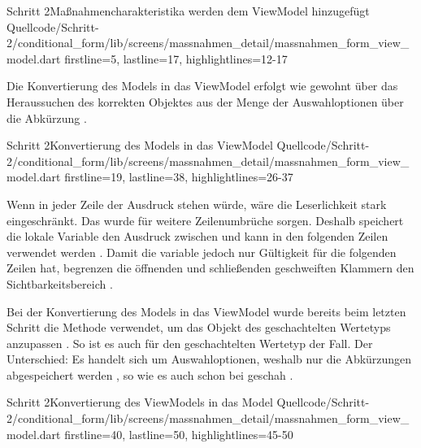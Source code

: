 \begin{alexlisting}{Schritt 2}{Maßnahmencharakteristika werden dem ViewModel hinzugefügt}
  {Quellcode/Schritt-2/conditional_form/lib/screens/massnahmen_detail/massnahmen_form_view_model.dart}
  {firstline=5, lastline=17, highlightlines={12-17}}
  \label{lst:Schritt2MassnahmencharakteristikaWerdenDemViewModelHinzugefuegt}
\end{alexlisting}


Die Konvertierung des Models in das ViewModel erfolgt wie gewohnt über das Heraussuchen des korrekten Objektes aus der Menge der Auswahloptionen über die Abkürzung . 

\begin{alexlisting}{Schritt 2}{Konvertierung des Models in das ViewModel}
  {Quellcode/Schritt-2/conditional_form/lib/screens/massnahmen_detail/massnahmen_form_view_model.dart}
  {firstline=19, lastline=38, highlightlines={26-37}}
  \label{lst:Schritt2KonvertierungDesModelsInDasViewModel}
\end{alexlisting}

Wenn in jeder Zeile der Ausdruck  stehen würde, wäre die Leserlichkeit stark eingeschränkt. Das wurde für weitere Zeilenumbrüche sorgen. Deshalb speichert die lokale Variable  den Ausdruck zwischen und kann in den folgenden Zeilen verwendet werden .
Damit die variable  jedoch nur Gültigkeit für die folgenden Zeilen hat, begrenzen die öffnenden und schließenden geschweiften Klammern den Sichtbarkeitsbereich .

Bei der Konvertierung des Models in das ViewModel wurde bereits beim letzten Schritt die Methode  verwendet, um das Objekt des geschachtelten Wertetyps  anzupassen . So ist es auch für den geschachtelten Wertetyp  der Fall. Der Unterschied: Es handelt sich um Auswahloptionen, weshalb nur die Abkürzungen abgespeichert werden , so wie es auch schon bei  geschah .

\begin{alexlisting}{Schritt 2}{Konvertierung des ViewModels in das Model}
  {Quellcode/Schritt-2/conditional_form/lib/screens/massnahmen_detail/massnahmen_form_view_model.dart}
  {firstline=40, lastline=50, highlightlines={45-50}}
  \label{lst:Schritt2KonvertierungDesViewModelsInDasModel}
\end{alexlisting}

